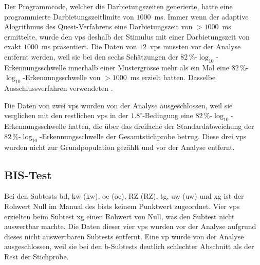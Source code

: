 \documentclass[11pt, twoside, a4paper]{book}		%
\begin{document}
Der Programmcode, welcher die Darbietungszeiten generierte, hatte eine programmierte Darbietungszeitlimite von $1000$~ms. Immer wenn der adaptive Alogrithmus des Quest-Verfahrens \citep{Watson1983} eine Darbietungszeit von $> 1000$~ms ermittelte, wurde den \glspl{vp} deshalb der Stimulus mit einer Darbietungszeit von exakt $1000$~ms präsentiert. 
Die Daten von $12$~\glspl{vp} mussten vor der Analyse entfernt werden, weil sie bei den sechs Schätzungen der $82\,\%$-$\log_{10}$-Er\-ken\-nungs\-schwel\-le innerhalb einer Mustergrösse mehr als ein Mal eine $82\,\%$-$\log_{10}$-Er\-ken\-nungs\-schwel\-le von $> 1000$~ms erzielt hatten. Dasselbe Ausschlussverfahren verwendeten \citet{Melnick2013}.

Die Daten von zwei \glspl{vp} wurden von der Analyse ausgeschlossen, weil sie verglichen mit den restlichen \glspl{vp} in der $1.8^{\circ}$-Be\-ding\-ung eine  $82\,\%$-$\log_{10}$-Er\-ken\-nungs\-schwel\-le hatten, die über das dreifache der Standardabweichung der $82\,\%$-$\log_{10}$-Er\-ken\-nungs\-schwel\-le der Gesamtstichprobe betrug. Diese drei \glspl{vp} wurden nicht zur Grundpopulation gezählt und vor der Analyse entfernt.

\subsection*{BIS-Test}
Bei den Subtests \gls{bd}, \acrlong{kw} (\gls{kw}), \acrlong{oe} (\gls{oe}), \acrlong{RZ} (\gls{RZ}), \gls{tg}, \acrlong{uw} (\gls{uw}) und \gls{xg} ist der Rohwert Null im Manual des \gls{bist}s \citep{Jaeger1997} keinem Punktwert zugeordnet. Vier \glspl{vp} erzielten beim Subtest \gls{xg} einen Rohwert von Null, was den Subtest nicht auswertbar machte. Die Daten dieser vier \glspl{vp} wurden vor der Analyse aufgrund dieses nicht auswertbaren Subtests entfernt. Eine \gls{vp} wurde von der Analyse ausgeschlossen, weil sie bei den \gls{b}-Subtests deutlich schlechter Abschnitt als der Rest der Stichprobe.

\vspace{1cm}
\end{document}
